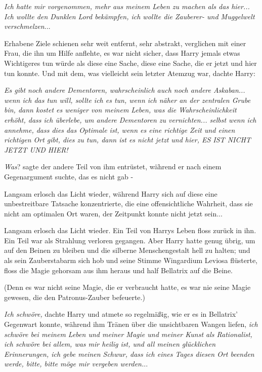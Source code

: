 \emph{Ich hatte mir vorgenommen, mehr aus meinem Leben zu machen als das
hier... Ich wollte den Dunklen Lord bekämpfen, ich wollte die Zauberer- und
Muggelwelt verschmelzen.}..

Erhabene Ziele schienen sehr weit entfernt, sehr abstrakt, verglichen mit einer
Frau, die ihn um Hilfe anflehte, es war nicht sicher, dass Harry jemals etwas
Wichtigeres tun würde als diese eine Sache, diese eine Sache, die er jetzt und
hier tun konnte. Und mit dem, was vielleicht sein letzter Atemzug war, dachte
Harry:

\emph{Es gibt noch andere Dementoren, wahrscheinlich auch noch andere Askaban...
wenn ich das tun will, sollte ich es tun, wenn ich näher an der zentralen Grube
bin, dann kostet es weniger von meinem Leben, was die Wahrscheinlichkeit erhöht,
dass ich überlebe, um andere Dementoren zu vernichten... selbst wenn ich
annehme, dass dies das Optimale ist, wenn es eine richtige Zeit und einen
richtigen Ort gibt, dies zu tun, dann ist es nicht jetzt und hier, ES IST NICHT
JETZT UND HIER!}

\emph{Was}? sagte der andere Teil von ihm entrüstet, während er nach einem
Gegenargument suchte, das es nicht gab -

Langsam erlosch das Licht wieder, während Harry sich auf diese eine
unbestreitbare Tatsache konzentrierte, die eine offensichtliche Wahrheit, dass
sie nicht am optimalen Ort waren, der Zeitpunkt konnte nicht jetzt sein...

Langsam erlosch das Licht wieder. Ein Teil von Harrys Leben floss zurück in ihn.
Ein Teil war als Strahlung verloren gegangen. Aber Harry hatte genug übrig, um
auf den Beinen zu bleiben und die silberne Menschengestalt hell zu halten; und
als sein Zauberstabarm sich hob und seine Stimme \glqq{}Wingardium Leviosa\grqq{}
flüsterte, floss die Magie gehorsam aus ihm heraus und half Bellatrix auf die
Beine.

(Denn es war nicht seine Magie, die er verbraucht hatte, es war nie seine Magie
gewesen, die den Patronus-Zauber befeuerte.)

\emph{Ich schwöre,} dachte Harry und atmete so regelmäßig, wie er es in
Bellatrix' Gegenwart konnte, während ihm Tränen über die unsichtbaren Wangen
liefen,\emph{ ich schwöre bei meinem Leben und meiner Magie und meiner Kunst als
Rationalist, ich schwöre bei allem, was mir heilig ist, und all meinen
glücklichen Erinnerungen, ich gebe meinen Schwur, dass ich eines Tages diesen
Ort beenden werde, bitte, bitte möge mir vergeben werden.}..

